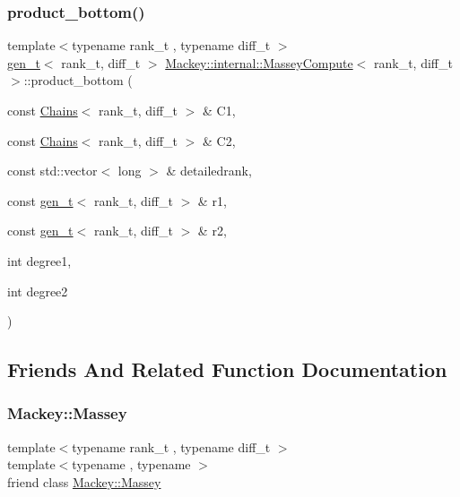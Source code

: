 \subsubsection{\texorpdfstring{product\+\_\+bottom()}{product\_bottom()}\hspace{0.1cm}{\footnotesize\ttfamily [2/2]}}
{\footnotesize\ttfamily template$<$typename rank\+\_\+t , typename diff\+\_\+t $>$ \\
\hyperlink{namespaceMackey_a6bb0b2796632ba6c7f8ea192f7aecffe}{gen\+\_\+t}$<$ rank\+\_\+t, diff\+\_\+t $>$ \hyperlink{structMackey_1_1internal_1_1MasseyCompute}{Mackey\+::internal\+::\+Massey\+Compute}$<$ rank\+\_\+t, diff\+\_\+t $>$\+::product\+\_\+bottom (\begin{DoxyParamCaption}\item[{const \hyperlink{classMackey_1_1Chains}{Chains}$<$ rank\+\_\+t, diff\+\_\+t $>$ \&}]{C1,  }\item[{const \hyperlink{classMackey_1_1Chains}{Chains}$<$ rank\+\_\+t, diff\+\_\+t $>$ \&}]{C2,  }\item[{const std\+::vector$<$ long $>$ \&}]{detailedrank,  }\item[{const \hyperlink{namespaceMackey_a6bb0b2796632ba6c7f8ea192f7aecffe}{gen\+\_\+t}$<$ rank\+\_\+t, diff\+\_\+t $>$ \&}]{r1,  }\item[{const \hyperlink{namespaceMackey_a6bb0b2796632ba6c7f8ea192f7aecffe}{gen\+\_\+t}$<$ rank\+\_\+t, diff\+\_\+t $>$ \&}]{r2,  }\item[{int}]{degree1,  }\item[{int}]{degree2 }\end{DoxyParamCaption})}



\subsection{Friends And Related Function Documentation}
\mbox{\label{structMackey_1_1internal_1_1MasseyCompute_a631db15cb61e8407e5ec0c5875905d39}} 
\subsubsection{\texorpdfstring{Mackey\+::\+Massey}{Mackey::Massey}}
{\footnotesize\ttfamily template$<$typename rank\+\_\+t , typename diff\+\_\+t $>$ \\
template$<$typename , typename $>$ \\
friend class \hyperlink{classMackey_1_1Massey}{Mackey\+::\+Massey}\hspace{0.3cm}{\ttfamily [friend]}}



